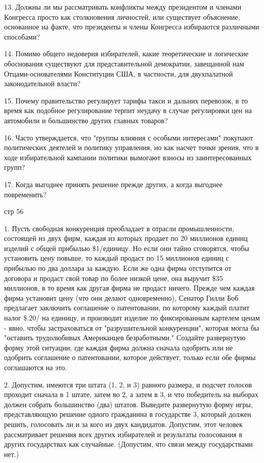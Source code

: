 \documentclass[a4paper,12pt]{article}
\begin{document}
13. Должны ли мы рассматривать конфликты между
президентом и членами Конгресса просто как
столкновения личностей, или существует объяснение,
основанное на факте, что президенты и члены
Конгресса избираются различными способами?

14. Помимо общего недоверия избирателей, какие
теоретические и логические обоснования существуют
для представительной демократии, завещанной нам
Отцами-основателями Конституции США, в частности,
для двухпалатной законодательной власти?

15. Почему правительство регулирует тарифы такси и
дальних перевозок, в то время как подобное
регулирование терпит неудачу в случае регулировки
цен на автомобили и большинство других главных
товаров?

16. Часто утверждается, что "группы влияния с
особыми интересами" покупают политических деятелей
и политику управления, но как насчет точки зрения,
что в ходе избирательной кампании политики вымогают
взносы из заинтересованных групп?

17. Когда выгоднее принять решение прежде других, а
когда выгоднее повременить?

стр 56

1. Пусть свободная конкуренция преобладает в
отрасли промышленности, состоящей из двух фирм,
каждая из которых продает по 20 миллионов единиц
изделий с общей прибылью \$1/единицу. Но если они
тайно сговорятся, чтобы установить цену повыше, то
каждый продаст по 15 миллионов единиц с прибылью по
два доллара за каждую. Если же одна фирма
отступится от договора и продаст свой товар по
более низкой цене, она выручит \$35 миллионов, в то
время как другая фирма не продаст ничего. Прежде
чем каждая фирма установит цену (что они делают
одновременно), Сенатор Гилли Боб предлагает
заключить соглашение о патентовании, по которому
каждый платит налог \$.20/ на единицу, и производит
изделие по фиксированным картелем ценам - явно,
чтобы застраховаться от "разрушительной
конкуренции", которая могла бы "оставить
трудолюбивых Американцев безработными." Создайте
развернутую форму этой ситуации, где каждая фирма
должна сначала одобрить или не одобрить соглашение
о патентовании, которое действует, только если обе
фирмы соглашаются на это.

2. Допустим, имеются три штата (1, 2, и 3) равного
размера, и подсчет голосов проходит сначала в 1
штате, затем во 2, а затем в 3, и что победитель на
выборах должен собрать большинство (два) штатов.
Выведите развернутую форму игры, представляющую
решение одного гражданина в государстве 3, который
должен решить, голосовать ли и за кого из двух
кандидатов. Допустим, этот человек рассматривает
решения всех других избирателей и результаты
голосования в других государствах как случайные.
(Допустим, что связи между государствами нет.)
\end{document}
